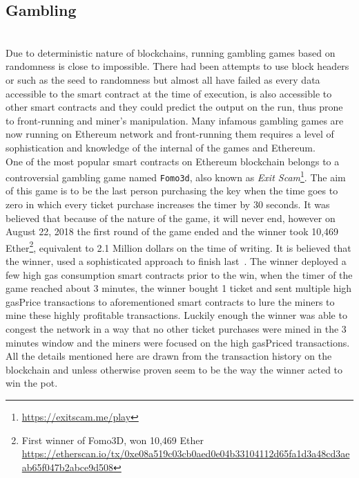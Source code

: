 
\subsection{Gambling} \hfill\\ 
Due to deterministic nature of blockchains, running gambling games based on randomness is close to impossible. There had been attempts to use block headers or such as the seed to randomness but almost all have failed as every data accessible to the smart contract at the time of execution, is also accessible to other smart contracts and they could predict the output on the run, thus prone to front-running and miner's manipulation. Many infamous gambling games are now running on Ethereum network and front-running them requires a level of sophistication and knowledge of the internal of the games and Ethereum.\\
One of the most popular smart contracts on Ethereum blockchain belongs to a controversial gambling game named \texttt{Fomo3d}, also known as \textit{Exit Scam}\footnote{\url{https://exitscam.me/play}}. The aim of this game is to be the last person purchasing the key when the time goes to zero in which every ticket purchase increases the timer by 30 seconds. It was believed that because of the nature of the game, it will never end, however on August 22, 2018 the first round of the game ended and the winner took 10,469 Ether\footnote{First winner of Fomo3D, won 10,469 Ether \url{ https://etherscan.io/tx/0xe08a519c03cb0aed0e04b33104112d65fa1d3a48cd3aeab65f047b2abce9d508}}, equivalent to 2.1 Million dollars on the time of writing. 
It is believed that the winner, used a sophisticated approach to finish last~\cite{fomo3dhacker}. The winner deployed a few high gas consumption smart contracts prior to the win, when the timer of the game reached about 3 minutes, the winner bought 1 ticket and sent multiple high gasPrice transactions to aforementioned smart contracts to lure the miners to mine these highly profitable transactions. Luckily enough the winner was able to congest the network in a way that no other ticket purchases were mined in the 3 minutes window and the miners were focused on the high gasPriced transactions. All the details mentioned here are drawn from the transaction history on the blockchain and unless otherwise proven seem to be the way the winner acted to win the pot. 

